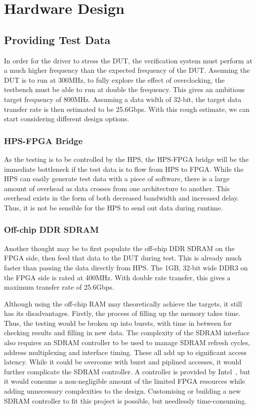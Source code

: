 \chapter{Hardware Design}

\section{Providing Test Data}
In order for the driver to stress the DUT, the verification system must perform at a much higher frequency than the expected frequency of the DUT.
Assuming the DUT is to run at 300MHz, to fully explore the effect of overclocking, the testbench must be able to run at double the frequency.
This gives an ambitious target frequency of 800MHz.
Assuming a data width of 32-bit, the target data transfer rate is then estimated to be 25.6Gbps.
With this rough estimate, we can start considering different design options.

\subsection{HPS-FPGA Bridge}
As the testing is to be controlled by the HPS, the HPS-FPGA bridge will be the immediate bottleneck if the test data is to flow from HPS to FPGA.
While the HPS can easily generate test data with a piece of software, there is a large amount of overhead as data crosses from one architecture to another.
This overhead exists in the form of both decreased bandwidth and increased delay.
Thus, it is not be sensible for the HPS to send out data during runtime.

\subsection{Off-chip DDR SDRAM}
Another thought may be to first populate the off-chip DDR SDRAM on the FPGA side, then feed that data to the DUT during test.
This is already much faster than passing the data directly from HPS.
The 1GB, 32-bit wide DDR3 on the FPGA side is rated at 400MHz.
With double rate transfer, this gives a maximum transfer rate of 25.6Gbps.

Although using the off-chip RAM may theoretically achieve the targets, it still has its disadvantages.
Firstly, the process of filling up the memory takes time.
Thus, the testing would be broken up into bursts, with time in between for checking results and filling in new data.
The complexity of the SDRAM interface also requires an SDRAM controller to be used to manage SDRAM refresh cycles, address multiplexing and interface timing.
These all add up to significant access latency.
While it could be overcome with burst and piplined accesses, it would further complicate the SDRAM controller.
A controller is provided by Intel~\cite{Altera3}, but it would consume a non-negligible amount of the limited FPGA resources while adding unnecessary complexities to the design.
Customising or building a new SDRAM controller to fit this project is possible, but needlessly time-consuming.

